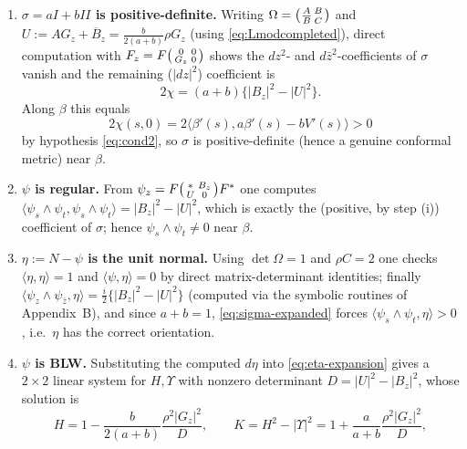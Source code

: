 \documentclass[11pt,a4paper]{article}
\newcommand{\ip}[2]{\langle #1,#2\rangle}            %
\theoremstyle{plain}
\theoremstyle{definition}
\theoremstyle{remark}
\begin{document}
\begin{enumerate}[label=(\roman*)]
\item \textbf{$\sigma=aI+bI\!I$ is positive-definite.} Writing
  $\Omega=\begin{psmallmatrix}A&B\\ \overline B&C\end{psmallmatrix}$ and
  $U:=AG_z+\overline B_z=\tfrac{b}{2(a+b)}\rho G_z$ (using
  \eqref{eq:Lmodcompleted}), direct computation with
  $F_z=F\begin{psmallmatrix}0&0\\G_z&0\end{psmallmatrix}$ shows the
  $dz^2$- and $d\bar z^2$-coefficients of $\sigma$ vanish and the
  remaining ($|dz|^2$) coefficient is
  \begin{equation}\label{eq:sigma-expanded}
    2\chi = (a+b)\big\{|B_z|^2-|U|^2\big\}.
  \end{equation}
  Along $\beta$ this equals
  \begin{equation}\label{eq:sigma-along-beta}
    2\chi(s,0) = 2\ip{\beta'(s)}{a\beta'(s)-bV'(s)} > 0
  \end{equation}
  by hypothesis \eqref{eq:cond2}, so $\sigma$ is positive-definite (hence
  a genuine conformal metric) near $\beta$.
\item \textbf{$\psi$ is regular.} From
  $\psi_z=F\begin{psmallmatrix}*&B_z\\U&0\end{psmallmatrix}F^*$ one
  computes $\ip{\psi_s\wedge\psi_t}{\psi_s\wedge\psi_t}=|B_z|^2-|U|^2$,
  which is exactly the (positive, by step (i)) coefficient of $\sigma$;
  hence $\psi_s\wedge\psi_t\neq0$ near $\beta$.
\item \textbf{$\eta:=N-\psi$ is the unit normal.} Using $\det\Omega=1$
  and $\rho C=2$ one checks $\ip\eta\eta=1$ and $\ip\psi\eta=0$ by direct
  matrix-determinant identities; finally
  $\ip{\psi_z\wedge\psi_{\bar z}}\eta = \tfrac i2\{|B_z|^2-|U|^2\}$ (computed
  via the symbolic routines of Appendix~B), and since $a+b=1$,
  \eqref{eq:sigma-expanded} forces $\ip{\psi_s\wedge\psi_t}\eta>0$, i.e.\
  $\eta$ has the correct orientation.
\item \textbf{$\psi$ is BLW.} Substituting the computed $d\eta$ into
  \eqref{eq:eta-expansion} gives a $2\times2$ linear system for $H,\Upsilon$
  with nonzero determinant $D=|U|^2-|B_z|^2$, whose solution is
  \[
    H = 1-\frac{b}{2(a+b)}\frac{\rho^2|G_z|^2}{D}, \qquad
    K = H^2-|\Upsilon|^2 = 1+\frac{a}{a+b}\frac{\rho^2|G_z|^2}{D},
\]
\end{enumerate}
\end{document}
